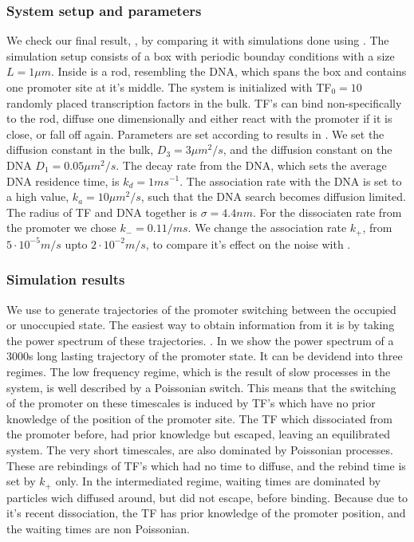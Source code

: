 \subsubsection{System setup and parameters}
We check our final result, , by comparing it with simulations done using \GFRD. The simulation setup consists of a box with periodic bounday conditions with a size $L=1\mu m$. Inside is a rod, resembling the DNA, which spans the box and contains one promoter site at it's middle. The system is initialized with TF$_0=10$ randomly placed transcription factors in the bulk. TF's can bind non-specifically to the rod, diffuse one dimensionally and either react with the promoter if it is close, or fall off again. Parameters are set according to results in \cite{Elf2007a}. We set the diffusion constant in the bulk, $D_3=3 \mu m^2/s$, and the diffusion constant on the DNA $D_1=0.05 \mu m^2/s$. The decay rate from the DNA, which sets the average DNA residence time, is $k_d=1ms^{-1}$. The association rate with the DNA is set to a high value, $k_a=10\mu m^2/s$, such that the DNA search becomes diffusion limited. The radius of TF and DNA together is $\sigma=4.4nm$. For the dissociaten rate from the promoter we chose $k_-=0.1 1/ms$. We change the association rate $k_+$, from $5\cdot10^{-5} m/s$ upto $2\cdot10^{-2} m/s$, to compare it's effect on the noise with . 

\subsubsection{Simulation results}
We use \GFRD to generate trajectories of the promoter switching between the occupied or unoccupied state. The easiest way to obtain information from it is by taking the power spectrum of these trajectories. \cite{Tkacik2009,VanZon2006}. In  we show the power spectrum of a 3000s long lasting trajectory of the promoter state. It can be devidend into three regimes. The low frequency regime, which is the result of slow processes in the system, is well described by a Poissonian switch. This means that the switching of the promoter on these timescales is induced by TF's which have no prior knowledge of the position of the promoter site. The TF which dissociated from the promoter before, had prior knowledge but escaped, leaving an equilibrated system. The very short timescales, are also dominated by Poissonian processes. These are rebindings of TF's which had no time to diffuse, and the rebind time is set by $k_+$ only. In the intermediated regime, waiting times are dominated by particles wich diffused around, but did not escape, before binding. Because due to it's recent dissociation, the TF has prior knowledge of the promoter position, and the waiting times are non Poissonian.

